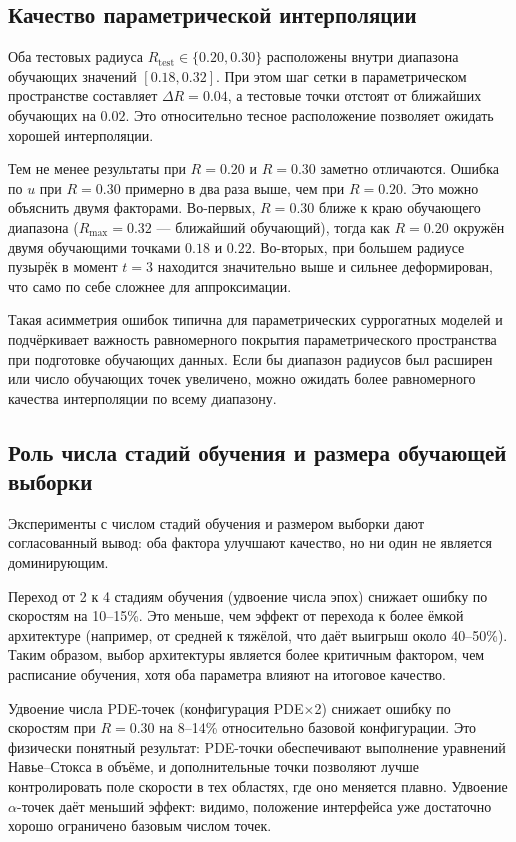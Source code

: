 \documentclass[12pt,a4paper]{article}
\begin{document}
\subsection{Качество параметрической интерполяции}

Оба тестовых радиуса \(R_{\mathrm{test}}\in\{0.20,0.30\}\) расположены внутри
диапазона обучающих значений \([0.18, 0.32]\). При этом шаг сетки в
параметрическом пространстве составляет \(\Delta R = 0.04\), а тестовые точки
отстоят от ближайших обучающих на \(0.02\). Это относительно тесное расположение
позволяет ожидать хорошей интерполяции.

Тем не менее результаты при \(R=0.20\) и \(R=0.30\) заметно отличаются.
Ошибка по \(u\) при \(R=0.30\) примерно в два раза выше, чем при \(R=0.20\).
Это можно объяснить двумя факторами. Во-первых, \(R=0.30\) ближе к краю
обучающего диапазона (\(R_{\max}=0.32\) --- ближайший обучающий), тогда как
\(R=0.20\) окружён двумя обучающими точками \(0.18\) и \(0.22\). Во-вторых,
при большем радиусе пузырёк в момент \(t=3\) находится значительно выше и
сильнее деформирован, что само по себе сложнее для аппроксимации.

Такая асимметрия ошибок типична для параметрических суррогатных моделей и
подчёркивает важность равномерного покрытия параметрического пространства при
подготовке обучающих данных. Если бы диапазон радиусов был расширен или число
обучающих точек увеличено, можно ожидать более равномерного качества
интерполяции по всему диапазону.

\subsection{Роль числа стадий обучения и размера обучающей выборки}

Эксперименты с числом стадий обучения и размером выборки дают согласованный
вывод: оба фактора улучшают качество, но ни один не является доминирующим.

Переход от 2 к 4 стадиям обучения (удвоение числа эпох) снижает ошибку по
скоростям на 10--15\%. Это меньше, чем эффект от перехода к более ёмкой
архитектуре (например, от средней к тяжёлой, что даёт выигрыш около 40--50\%).
Таким образом, выбор архитектуры является более критичным фактором, чем
расписание обучения, хотя оба параметра влияют на итоговое качество.

Удвоение числа PDE-точек (конфигурация PDE$\times$2) снижает ошибку по
скоростям при \(R=0.30\) на 8--14\% относительно базовой конфигурации. Это физически
понятный результат: PDE-точки обеспечивают выполнение уравнений Навье--Стокса
в объёме, и дополнительные точки позволяют лучше контролировать поле скорости в
тех областях, где оно меняется плавно. Удвоение \(\alpha\)-точек даёт меньший эффект:
видимо, положение интерфейса уже достаточно хорошо ограничено базовым числом
точек.
\end{document}
